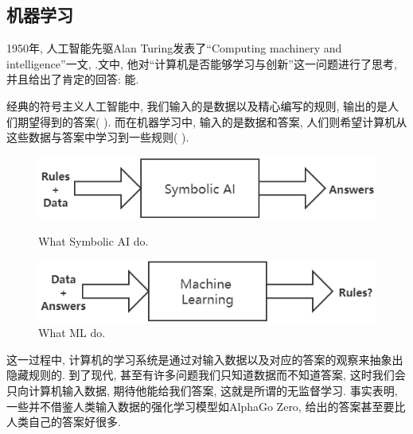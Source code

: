 \documentclass[lang=cn,11pt,a4paper]{elegantpaper}
\begin{document}
\subsection{机器学习}
\par 1950年, 人工智能先驱Alan Turing发表了“Computing machinery and intelligence”一文\cite{Turing2009}, .文中, 他对“计算机是否能够学习与创新”这一问题进行了思考, 并且给出了肯定的回答: 能. 
\par 经典的符号主义人工智能中, 我们输入的是数据以及精心编写的规则, 输出的是人们期望得到的答案( ). 而在机器学习中, 输入的是数据和答案, 人们则希望计算机从这些数据与答案中学习到一些规则( ). 
\begin{figure}[htbp]
	\centering
	\begin{minipage}[t]{0.45\textwidth}
	\centering
	\includegraphics[width=1\textwidth]{Old}
	\caption{What Symbolic AI do.\label{fig:old}}
	\end{minipage}
	\begin{minipage}[t]{0.45\textwidth}
	\centering
	\includegraphics[width=1\textwidth]{Now}
	\caption{What ML do.\label{fig:now}}
	\end{minipage}
\end{figure}
\par 这一过程中, 计算机的学习系统是通过对输入数据以及对应的答案的观察来抽象出隐藏规则的. 到了现代, 甚至有许多问题我们只知道数据而不知道答案, 这时我们会只向计算机输入数据, 期待他能给我们答案, 这就是所谓的无监督学习. 事实表明, 一些并不借鉴人类输入数据的强化学习模型如AlphaGo Zero, 给出的答案甚至要比人类自己的答案好很多. 
\end{document}
